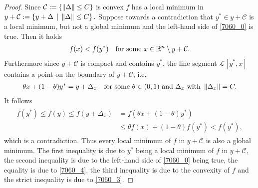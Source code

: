 \begin{proof}
  Since 
  $\mathcal{C}:=\left\{ \left\lVert\Delta\right\rVert\le C \right\}$
  is convex
  $f$ has a local minimum in 
  $
    y + \mathcal{C}
    :=
    \left\{ 
      y + \Delta \,
      \mid \,
      \left\lVert\Delta\right\rVert\le C
    \right\}
    .
  $
  Suppose towards a contradiction that
  $
    y^* \in 
            y + \mathcal{C}
  $
  is a local minimum, but not a global minimum 
  and
  the left-hand side of 
  \eqref{7060_0} is true.
  Then it holds
  \begin{gather}
    \label{7060_3}
    f(x) < f(y^*)
    \quad
    \text{for some}\ 
    x 
    \in 
    \R^n 
    \setminus 
      y + \mathcal{C}
    .
  \end{gather}
  Furthermore since $y + \mathcal{C}$ is compact and contains $y^*$,
  the line segment $\mathcal{L}[y^*,x]$ contains a point on the boundary of 
  $y + \mathcal{C}$, i.e.
  \begin{gather}
    \label{7060_4}
    \theta x + (1 - \theta) y^* = y + \Delta_x
    \quad
    \text{for some}\ 
    \theta \in (0,1)\ 
    \text{and}\ 
    \Delta_x \ 
    \text{with}\ 
    \norm{\Delta_x}=C
    .
  \end{gather}
    It follows
    \begin{align}
      \label{7060_5}
      \begin{split}
      f(y^*)
      \le
      f(y)
      \le
      f(y + \Delta_x)
      &=
      f(
        \theta x + (1 - \theta) y^*
      )
      \\
      &\le
      \theta f(x)
      + 
      (1 - \theta)
      f(y^*)
      <
      f(y^*)
      ,
      \end{split}
    \end{align}
    which is a contradiction.
    Thus every local minimum of $f$ in $y + \mathcal{C}$ is also a global minimum.
    The first inequality is due to
    $y^*$ being a local minimum of $f$ in
    $
      y + \mathcal{C},
    $
    the second inequality is due to the left-hand side of 
    \eqref{7060_0} being true,
    the equality is due to \eqref{7060_4},
    the third inequality is due to the convexity of $f$
    and the strict inequality is due to \eqref{7060_3}.
\end{proof}


